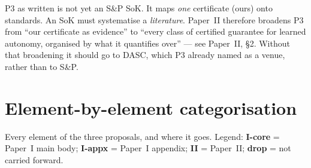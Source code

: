 \documentclass[11pt,a4paper]{article}
\newcommand{\core}{\textcolor{autocol}{\textbf{I-core}}}
\newcommand{\appx}{\textcolor{netcol}{\textbf{I-appx}}}
\newcommand{\sok}{\textcolor{bridgecol}{\textbf{II}}}
\newcommand{\drop}{\textbf{drop}}
\begin{document}
\begin{honestly}
P3 as written is not yet an S\&P SoK. It maps \emph{one} certificate (ours) onto
standards. An SoK must systematise a \emph{literature}. Paper~II therefore
broadens P3 from ``our certificate as evidence'' to ``every class of certified
guarantee for learned autonomy, organised by what it quantifies over'' --- see
Paper~II, \S2. Without that broadening it should go to DASC, which P3 already
named as a venue, rather than to S\&P.
\end{honestly}

\section{Element-by-element categorisation}
Every element of the three proposals, and where it goes. Legend:
\core{} = Paper~I main body;
\appx{} = Paper~I appendix;
\sok{} = Paper~II;
\drop{} = not carried forward.
\end{document}
